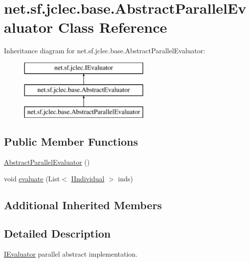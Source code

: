\hypertarget{classnet_1_1sf_1_1jclec_1_1base_1_1_abstract_parallel_evaluator}{\section{net.\-sf.\-jclec.\-base.\-Abstract\-Parallel\-Evaluator Class Reference}
\label{classnet_1_1sf_1_1jclec_1_1base_1_1_abstract_parallel_evaluator}
}
Inheritance diagram for net.\-sf.\-jclec.\-base.\-Abstract\-Parallel\-Evaluator\-:\begin{figure}[H]
\begin{center}
\leavevmode
\includegraphics[height=3.000000cm]{classnet_1_1sf_1_1jclec_1_1base_1_1_abstract_parallel_evaluator}
\end{center}
\end{figure}
\subsection*{Public Member Functions}
\begin{DoxyCompactItemize}
\item 
\hyperlink{classnet_1_1sf_1_1jclec_1_1base_1_1_abstract_parallel_evaluator_aff72218d817d0e002950fc43b7d223fe}{Abstract\-Parallel\-Evaluator} ()
\item 
void \hyperlink{classnet_1_1sf_1_1jclec_1_1base_1_1_abstract_parallel_evaluator_a56032c17683595e1667391594a31103d}{evaluate} (List$<$ \hyperlink{interfacenet_1_1sf_1_1jclec_1_1_i_individual}{I\-Individual} $>$ inds)
\end{DoxyCompactItemize}
\subsection*{Additional Inherited Members}


\subsection{Detailed Description}
\hyperlink{interfacenet_1_1sf_1_1jclec_1_1_i_evaluator}{I\-Evaluator} parallel abstract implementation.

